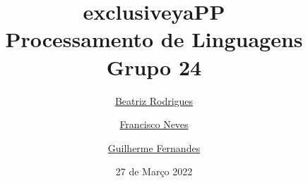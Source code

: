 \documentclass{article}
\begin{document}
\title{exclusive}
\maketitle
\author{\href{https://github.com/beasrodrigues24}{Beatriz Rodrigues}  \and \href{https://github.com/franl08}{Francisco Neves}  \and \href{https://github.com/zer0-5}{Guilherme Fernandes}}
\date{27 de Março 2022}
\title{\LARGE \textbf{yaPP}\\
    \Large Processamento de Linguagens\\
    \large Grupo 24 \\
}
\maketitle
\end{document}
